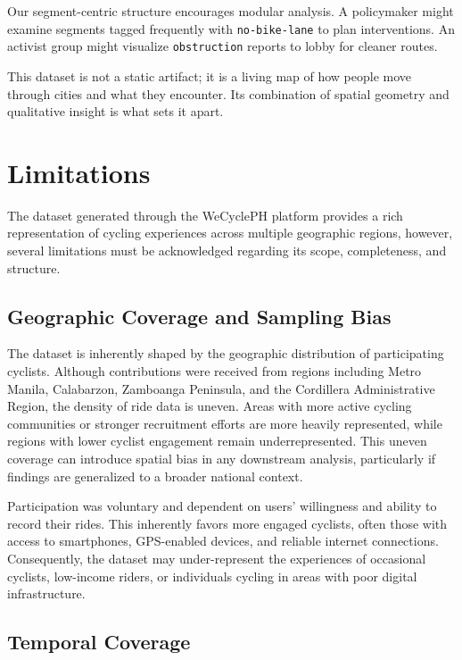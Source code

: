 Our segment-centric structure encourages modular analysis. A policymaker might examine segments tagged frequently with \texttt{no-bike-lane} to plan interventions. An activist group might visualize \texttt{obstruction} reports to lobby for cleaner routes.

This dataset is not a static artifact; it is a living map of how people move through cities and what they encounter. Its combination of spatial geometry and qualitative insight is what sets it apart.

\section{Limitations}

 The dataset generated through the WeCyclePH platform provides a rich representation of cycling experiences across multiple geographic regions, however, several limitations must be acknowledged regarding its scope, completeness, and structure.

\subsection{Geographic Coverage and Sampling Bias}

The dataset is inherently shaped by the geographic distribution of participating cyclists. Although contributions were received from regions including Metro Manila, Calabarzon, Zamboanga Peninsula, and the Cordillera Administrative Region, the density of ride data is uneven. Areas with more active cycling communities or stronger recruitment efforts are more heavily represented, while regions with lower cyclist engagement remain underrepresented. This uneven coverage can introduce spatial bias in any downstream analysis, particularly if findings are generalized to a broader national context.

Participation was voluntary and dependent on users' willingness and ability to record their rides. This inherently favors more engaged cyclists, often those with access to smartphones, GPS-enabled devices, and reliable internet connections. Consequently, the dataset may under-represent the experiences of occasional cyclists, low-income riders, or individuals cycling in areas with poor digital infrastructure.


\subsection{Temporal Coverage}

